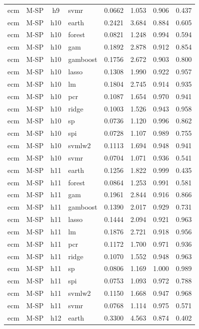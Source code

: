 \begin{ThreePartTable}
\begin{longtable}[t]{llclcccc}
ecm & M-SP & h9 & svmr & 0.0662 & 1.053 & 0.906 & 0.437\\
\addlinespace
ecm & M-SP & h10 & earth & 0.2421 & 3.684 & 0.884 & 0.605\\
ecm & M-SP & h10 & forest & 0.0821 & 1.248 & 0.994 & 0.594\\
ecm & M-SP & h10 & gam & 0.1892 & 2.878 & 0.912 & 0.854\\
ecm & M-SP & h10 & gamboost & 0.1756 & 2.672 & 0.903 & 0.800\\
ecm & M-SP & h10 & lasso & 0.1308 & 1.990 & 0.922 & 0.957\\
ecm & M-SP & h10 & lm & 0.1804 & 2.745 & 0.914 & 0.935\\
ecm & M-SP & h10 & pcr & 0.1087 & 1.654 & 0.970 & 0.941\\
ecm & M-SP & h10 & ridge & 0.1003 & 1.526 & 0.943 & 0.958\\
ecm & M-SP & h10 & sp & 0.0736 & 1.120 & 0.996 & 0.862\\
ecm & M-SP & h10 & spi & 0.0728 & 1.107 & 0.989 & 0.755\\
ecm & M-SP & h10 & svmlw2 & 0.1113 & 1.694 & 0.948 & 0.941\\
ecm & M-SP & h10 & svmr & 0.0704 & 1.071 & 0.936 & 0.541\\
\addlinespace
ecm & M-SP & h11 & earth & 0.1256 & 1.822 & 0.999 & 0.435\\
ecm & M-SP & h11 & forest & 0.0864 & 1.253 & 0.991 & 0.581\\
ecm & M-SP & h11 & gam & 0.1961 & 2.844 & 0.916 & 0.866\\
ecm & M-SP & h11 & gamboost & 0.1390 & 2.017 & 0.929 & 0.731\\
ecm & M-SP & h11 & lasso & 0.1444 & 2.094 & 0.921 & 0.963\\
ecm & M-SP & h11 & lm & 0.1876 & 2.721 & 0.918 & 0.956\\
ecm & M-SP & h11 & pcr & 0.1172 & 1.700 & 0.971 & 0.936\\
ecm & M-SP & h11 & ridge & 0.1070 & 1.552 & 0.948 & 0.963\\
ecm & M-SP & h11 & sp & 0.0806 & 1.169 & 1.000 & 0.989\\
ecm & M-SP & h11 & spi & 0.0753 & 1.093 & 0.972 & 0.788\\
ecm & M-SP & h11 & svmlw2 & 0.1150 & 1.668 & 0.947 & 0.968\\
ecm & M-SP & h11 & svmr & 0.0768 & 1.114 & 0.975 & 0.571\\
\addlinespace
ecm & M-SP & h12 & earth & 0.3300 & 4.563 & 0.874 & 0.402\\

\end{longtable}
\end{ThreePartTable}
